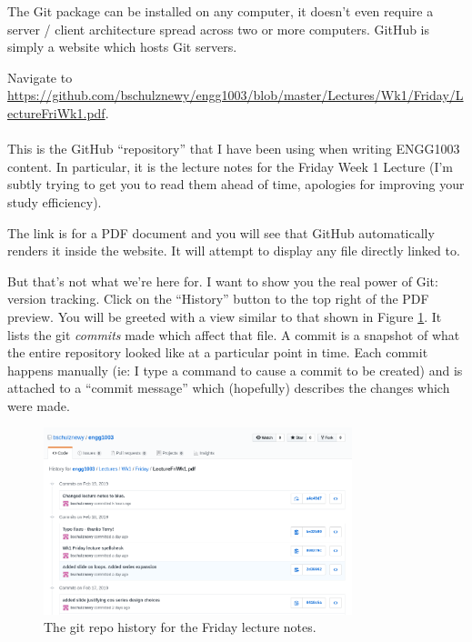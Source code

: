 \documentclass{lab}
\begin{document}
The Git package can be installed on any computer, it doesn't even require a server / client architecture spread across two or more computers. GitHub is simply a website which hosts Git servers.

\begin{task}{}{} Navigate to \url{https://github.com/bschulznewy/engg1003/blob/master/Lectures/Wk1/Friday/LectureFriWk1.pdf}.
\\ \\ 
This is the GitHub ``repository'' that I have been using when writing ENGG1003 content. In particular, it is the lecture notes for the Friday Week 1 Lecture (I'm subtly trying to get you to read them ahead of time, apologies for improving your study efficiency).
\end{task}

The link is for a PDF document and you will see that GitHub automatically renders it inside the website. It will attempt to display any file directly linked to.

But that's not what we're here for. I want to show you the real power of Git: version tracking. Click on the ``History'' button to the top right of the PDF preview. You will be greeted with a view similar to that shown in Figure \ref{fig:githistory}. It lists the git \textit{commits} made which affect that file. A commit is a snapshot of what the entire repository looked like at a particular point in time. Each commit happens manually (ie: I type a command to cause a commit to be created) and is attached to a ``commit message'' which (hopefully) describes the changes which were made.

\begin{figure}[H]
\begin{center}
\includegraphics[width=0.8\textwidth]{Wk1Images/github_lecture.png}
\end{center}
\caption{The git repo history for the Friday lecture notes.}\label{fig:githistory}
\end{figure}
\end{document}
